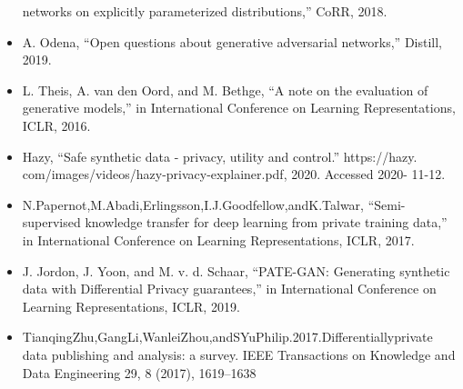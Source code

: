 \documentclass[11pt]{article}
\begin{document}
\begin{itemize}
        networks on explicitly parameterized distributions,” CoRR, 2018.
        \item A. Odena, “Open questions about generative adversarial networks,”
        Distill, 2019.
        \item L. Theis, A. van den Oord, and M. Bethge, “A note on the evaluation
        of generative models,” in International Conference on Learning Representations, ICLR, 2016.
        \item Hazy, “Safe synthetic data - privacy, utility and control.” https://hazy.
        com/images/videos/hazy-privacy-explainer.pdf, 2020. Accessed 2020-
        11-12.
        \item N.Papernot,M.Abadi,Erlingsson,I.J.Goodfellow,andK.Talwar, “Semi-supervised knowledge transfer for deep learning from private training data,” in International Conference on Learning Representations, ICLR, 2017.
        \item J. Jordon, J. Yoon, and M. v. d. Schaar, “PATE-GAN: Generating synthetic data with Differential Privacy guarantees,” in International Conference on Learning Representations, ICLR, 2019.
        \item TianqingZhu,GangLi,WanleiZhou,andSYuPhilip.2017.Differentiallyprivate data publishing and analysis: a survey. IEEE Transactions on Knowledge and Data  Engineering 29, 8 (2017), 1619–1638
    \end{itemize}
\end{document}
